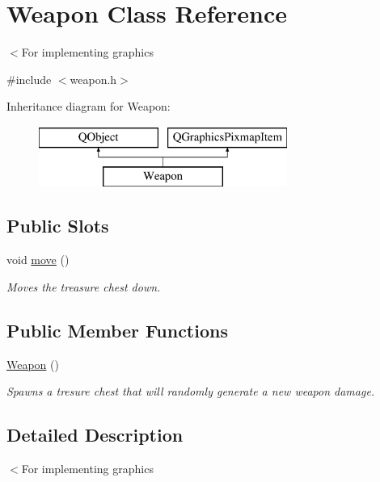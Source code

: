 \hypertarget{class_weapon}{}\section{Weapon Class Reference}
\label{class_weapon}


$<$For implementing graphics  




{\ttfamily \#include $<$weapon.\+h$>$}

Inheritance diagram for Weapon\+:\begin{figure}[H]
\begin{center}
\leavevmode
\includegraphics[height=2.000000cm]{class_weapon}
\end{center}
\end{figure}
\subsection*{Public Slots}
\begin{DoxyCompactItemize}
\item 
void \hyperlink{class_weapon_a1d62683b1b6dc0795420c7da6f141437}{move} ()
\begin{DoxyCompactList}\small\item\em Moves the treasure chest down. \end{DoxyCompactList}\end{DoxyCompactItemize}
\subsection*{Public Member Functions}
\begin{DoxyCompactItemize}
\item 
\hyperlink{class_weapon_a42dbc46dd70319a24763992c4ebbd396}{Weapon} ()
\begin{DoxyCompactList}\small\item\em Spawns a tresure chest that will randomly generate a new weapon damage. \end{DoxyCompactList}\end{DoxyCompactItemize}


\subsection{Detailed Description}
$<$For implementing graphics 

